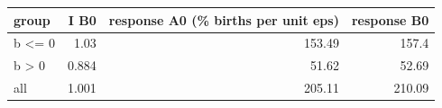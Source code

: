 \begin{tabular}{lrrr}
\toprule
group & I B0 & response A0 (\% births per unit eps) & response B0 \\
\midrule
b <= 0 & 1.03 & 153.49 & 157.4 \\
b > 0 & 0.884 & 51.62 & 52.69 \\
all & 1.001 & 205.11 & 210.09 \\
\bottomrule
\end{tabular}
